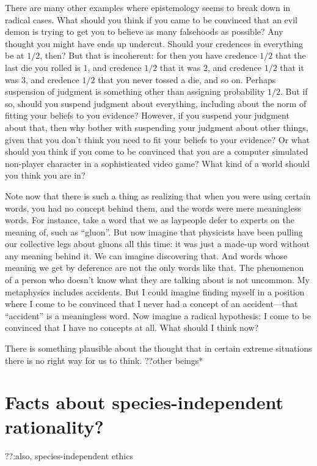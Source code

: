 There are many other examples where epistemology seems to break down in radical cases. What should you think if you came to be
convinced that an evil demon is trying to get you to believe as many falsehoods as possible? Any thought you might have ends
up undercut. Should your credences in everything be at $1/2$, then? But that is incoherent: for then you have credence $1/2$
that the last die you rolled is $1$, and credence $1/2$ that it was $2$, and credence $1/2$ that it was $3$, and credence $1/2$
that you never tossed a die, and so on. Perhaps suspension of judgment is something other than assigning probability $1/2$. But 
if so, should you suspend judgment about everything, including about the norm of fitting your beliefs to you evidence? However,
if you suspend your judgment about that, then why bother with suspending your judgment about other things, given that you don't 
think you need to fit your beliefs to your evidence? Or what should you think if you come to be convinced that you are a computer 
simulated non-player character in a sophisticated video game? What kind of a world should you think you are in? 

Note now that there is such a thing as realizing that when you were using certain words, you had no concept behind them, and
the words were mere meaningless words. For instance, take a word that we as laypeople defer to experts on the meaning of, such
as ``gluon''. But now imagine that physicists have been pulling our collective legs about gluons all this time: it was just a 
made-up word without any meaning behind it. We can imagine discovering that. And words whose meaning we get by deference are not
the only words like that. The phenomenon of a person who doesn't know what they are talking about is not uncommon. My metaphysics
includes accidents. But I could imagine finding myself in a position where I come to be convinced that I never had a concept of
an accident---that ``accident'' is a meaningless word. Now imagine a radical hypothesis: I come to be convinced that I have no
concepts at all. What should I think now? 

There is something plausible about the thought that in certain extreme situations there is no right way for us to think.
??other beings*

\section{Facts about species-independent rationality?}
??:also, species-independent ethics 

